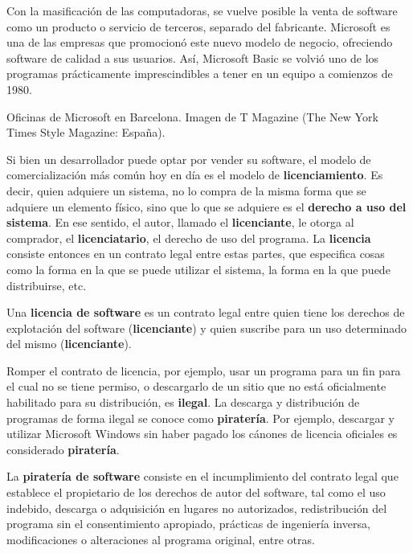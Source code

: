 Con la masificación de las computadoras, se vuelve posible la venta de software
como un producto o servicio de terceros, separado del fabricante. Microsoft es
una de las empresas que promocionó este nuevo modelo de negocio, ofreciendo
software de calidad a sus usuarios. Así, Microsoft Basic se volvió uno de los
programas prácticamente imprescindibles a tener en un equipo a comienzos de
1980.

{Oficinas de Microsoft en Barcelona.} {Imagen de T Magazine (The New York Times
Style Magazine: España).}

 Si bien un
desarrollador puede optar por vender su software, el modelo de comercialización
más común hoy en día es el modelo de \textbf{licenciamiento}. Es decir, quien
adquiere un sistema, no lo compra de la misma forma que se adquiere un elemento
físico, sino que lo que se adquiere es el \textbf{derecho a uso del sistema}. En
ese sentido, el autor, llamado el \textbf{licenciante}, le otorga al comprador,
el \textbf{licenciatario}, el derecho de uso del programa. La \textbf{licencia}
consiste entonces en un contrato legal entre estas partes, que especifica cosas
como la forma en la que se puede utilizar el sistema, la forma en la que puede
distribuirse, etc.

\begin{definition}
    Una \textbf{licencia de software} es un contrato legal entre quien tiene los
    derechos de explotación del software (\textbf{licenciante}) y quien suscribe
    para un uso determinado del mismo (\textbf{licenciante}).
\end{definition}

Romper el contrato de licencia, por ejemplo, usar un programa para un fin para
el cual no se tiene permiso, o descargarlo de un sitio que no está oficialmente
habilitado para su distribución, es \textbf{ilegal}. La descarga y distribución
de programas de forma ilegal se conoce como \textbf{piratería}. Por ejemplo,
descargar y utilizar Microsoft Windows sin haber pagado los cánones de licencia
oficiales es considerado \textbf{piratería}.

\begin{definition}
    La \textbf{piratería de software} consiste en el incumplimiento del contrato
    legal que establece el propietario de los derechos de autor del software,
    tal como el uso indebido, descarga o adquisición en lugares no autorizados,
    redistribución del programa sin el consentimiento apropiado, prácticas de
    ingeniería inversa, modificaciones o alteraciones al programa original,
    entre otras.
\end{definition}

